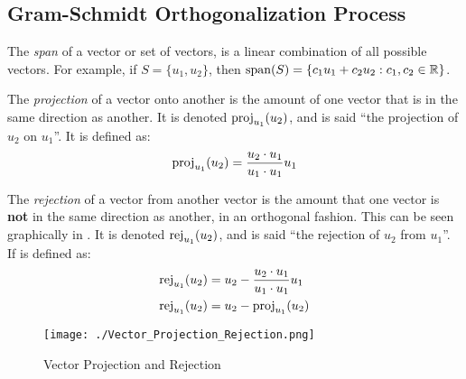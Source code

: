\subsection{Gram-Schmidt Orthogonalization Process}\label{subsec:Gram-Schmidt_Orthogonalization}
\begin{definition}[Span]\label{def:Span}
  The \emph{span} of a vector or set of vectors, is a linear combination of all possible vectors.
  For example, if $S = \lbrace u_{1}, u_{2} \rbrace$, then $\Span(S) = \lbrace c_{1}u_{1} + c_{2}u_{2} : c_{1}, c_{2} \in \RealNumbers \rbrace$.
\end{definition}

\begin{definition}[Projection]\label{def:Vector_Projection}
  The \emph{projection} of a vector onto another is the amount of one vector that is in the same direction as another.
  It is denoted $\Proj{u_{2}}{u_{1}}$, and is said ``the projection of $u_{2}$ on $u_{1}$''.
  It is defined as:
  \begin{equation}\label{eq:Vector_Projection}
    \Proj{u_{2}}{u_{1}} = \frac{u_{2} \cdot u_{1}}{u_{1} \cdot u_{1}} u_{1}
  \end{equation}
\end{definition}

\begin{definition}[Rejection]\label{def:Vector_Rejection}
  The \emph{rejection} of a vector from another vector is the amount that one vector is \textbf{not} in the same direction as another, in an orthogonal fashion.
  This can be seen graphically in .
  It is denoted $\Rej{u_{2}}{u_{1}}$, and is said ``the rejection of $u_{2}$ from $u_{1}$''.
  If is defined as:
  \begin{equation}\label{eq:Vector_Rejection}
    \begin{aligned}
      \Rej{u_{2}}{u_{1}} &= u_{2} - \frac{u_{2} \cdot u_{1}}{u_{1} \cdot u_{1}} u_{1} \\
      \Rej{u_{2}}{u_{1}} &= u_{2} - \Proj{u_{2}}{u_{1}}
    \end{aligned}
  \end{equation}
\end{definition}

\begin{figure}[h!tbp]
  \centering
  \texttt{[image: ./Vector\_Projection\_Rejection.png]}
  \caption{Vector Projection and Rejection}
  \label{fig:Vector_Projection_Rejection}
\end{figure}

